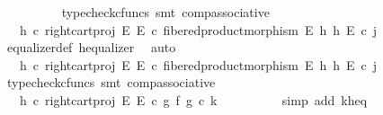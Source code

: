 \begin{isabellebody}
\ \ \ \ \ \ \ \ \isamarkupfalse%
\ {\isacharparenleft}{\kern0pt}typecheck{\isacharunderscore}{\kern0pt}cfuncs{\isacharcomma}{\kern0pt}\ smt\ comp{\isacharunderscore}{\kern0pt}associative{}{\isacharparenright}{\kern0pt}\isanewline
\ \ \ \ \ \ \isamarkupfalse%
\ \isamarkupfalse%
\ {\isachardoublequoteopen}{\isachardot}{\kern0pt}{\isachardot}{\kern0pt}{\isachardot}{\kern0pt}\ {\isacharequal}{\kern0pt}\ {\isacharparenleft}{\kern0pt}{\isacharparenleft}{\kern0pt}h\ {\isasymcirc}\isactrlsub c\ right{\isacharunderscore}{\kern0pt}cart{\isacharunderscore}{\kern0pt}proj\ E\ E{\isacharparenright}{\kern0pt}\ {\isasymcirc}\isactrlsub c\ fibered{\isacharunderscore}{\kern0pt}product{\isacharunderscore}{\kern0pt}morphism\ E\ h\ h\ E{\isacharparenright}{\kern0pt}\ {\isasymcirc}\isactrlsub c\ j{\isachardoublequoteclose}\isanewline
\ \ \ \ \ \ \ \ \isamarkupfalse%
\ equalizer{\isacharunderscore}{\kern0pt}def\ h{\isacharunderscore}{\kern0pt}equalizer\ \isamarkupfalse%
\ auto\isanewline
\ \ \ \ \ \ \isamarkupfalse%
\ \isamarkupfalse%
\ {\isachardoublequoteopen}{\isachardot}{\kern0pt}{\isachardot}{\kern0pt}{\isachardot}{\kern0pt}\ {\isacharequal}{\kern0pt}\ h\ {\isasymcirc}\isactrlsub c\ right{\isacharunderscore}{\kern0pt}cart{\isacharunderscore}{\kern0pt}proj\ E\ E\ {\isasymcirc}\isactrlsub c\ fibered{\isacharunderscore}{\kern0pt}product{\isacharunderscore}{\kern0pt}morphism\ E\ h\ h\ E\ {\isasymcirc}\isactrlsub c\ j{\isachardoublequoteclose}\isanewline
\ \ \ \ \ \ \ \ \isamarkupfalse%
\ {\isacharparenleft}{\kern0pt}typecheck{\isacharunderscore}{\kern0pt}cfuncs{\isacharcomma}{\kern0pt}\ smt\ comp{\isacharunderscore}{\kern0pt}associative{}{\isacharparenright}{\kern0pt}\isanewline
\ \ \ \ \ \ \isamarkupfalse%
\ \isamarkupfalse%
\ {\isachardoublequoteopen}{\isachardot}{\kern0pt}{\isachardot}{\kern0pt}{\isachardot}{\kern0pt}\ {\isacharequal}{\kern0pt}\ h\ {\isasymcirc}\isactrlsub c\ right{\isacharunderscore}{\kern0pt}cart{\isacharunderscore}{\kern0pt}proj\ E\ E\ {\isasymcirc}\isactrlsub c\ {\isacharparenleft}{\kern0pt}g\ {\isasymtimes}\isactrlsub f\ g{\isacharparenright}{\kern0pt}\ {\isasymcirc}\isactrlsub c\ k{\isachardoublequoteclose}\isanewline
\ \ \ \ \ \ \ \ \isamarkupfalse%
\ {\isacharparenleft}{\kern0pt}simp\ add{\isacharcolon}{\kern0pt}\ k{\isacharunderscore}{\kern0pt}h{\isacharunderscore}{\kern0pt}eq{\isacharparenright}{\kern0pt}\isanewline
\ \ \ \ \ \ \isamarkupfalse%

\end{isabellebody}
